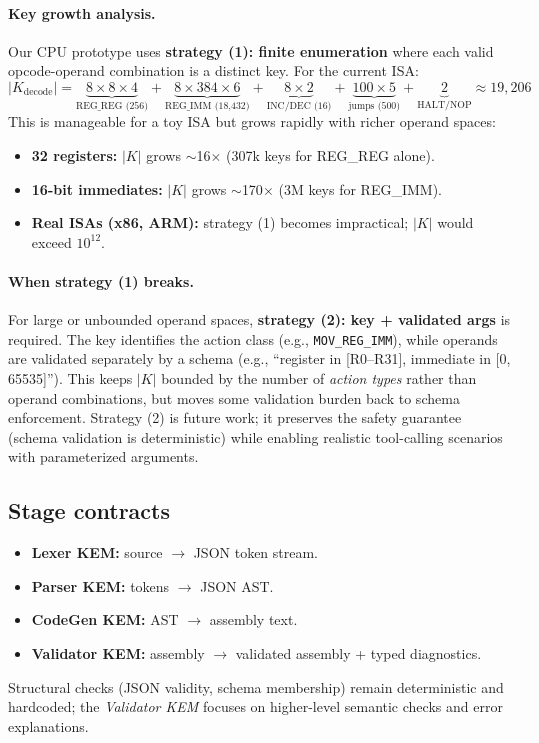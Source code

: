 \documentclass[11pt]{article}
\begin{document}
\paragraph{Key growth analysis.}
Our CPU prototype uses \textbf{strategy (1): finite enumeration} where each valid opcode-operand combination is a distinct key.
For the current ISA:
\[
|K_{\mathrm{decode}}| = \underbrace{8 \times 8 \times 4}_{\text{REG\_REG (256)}} + \underbrace{8 \times 384 \times 6}_{\text{REG\_IMM (18,432)}} + \underbrace{8 \times 2}_{\text{INC/DEC (16)}} + \underbrace{100 \times 5}_{\text{jumps (500)}} + \underbrace{2}_{\text{HALT/NOP}} \approx 19{,}206
\]
This is manageable for a toy ISA but grows rapidly with richer operand spaces:
\begin{itemize}[leftmargin=*]
  \item \textbf{32 registers:} $|K|$ grows $\sim$16$\times$ (307k keys for REG\_REG alone).
  \item \textbf{16-bit immediates:} $|K|$ grows $\sim$170$\times$ (3M keys for REG\_IMM).
  \item \textbf{Real ISAs (x86, ARM):} strategy (1) becomes impractical; $|K|$ would exceed $10^{12}$.
\end{itemize}

\paragraph{When strategy (1) breaks.}
For large or unbounded operand spaces, \textbf{strategy (2): key + validated args} is required.
The key identifies the action class (e.g., \texttt{MOV\_REG\_IMM}), while operands are validated separately by a schema (e.g., ``register in [R0--R31], immediate in [0, 65535]'').
This keeps $|K|$ bounded by the number of \emph{action types} rather than operand combinations, but moves some validation burden back to schema enforcement.
Strategy (2) is future work; it preserves the safety guarantee (schema validation is deterministic) while enabling realistic tool-calling scenarios with parameterized arguments.

\subsection{Stage contracts}
\begin{itemize}[leftmargin=*]
  \item \textbf{Lexer KEM:} source $\rightarrow$ JSON token stream.
  \item \textbf{Parser KEM:} tokens $\rightarrow$ JSON AST.
  \item \textbf{CodeGen KEM:} AST $\rightarrow$ assembly text.
  \item \textbf{Validator KEM:} assembly $\rightarrow$ validated assembly + typed diagnostics.
\end{itemize}
Structural checks (JSON validity, schema membership) remain deterministic and hardcoded; the \emph{Validator KEM} focuses on higher-level semantic checks and error explanations.
\end{document}
